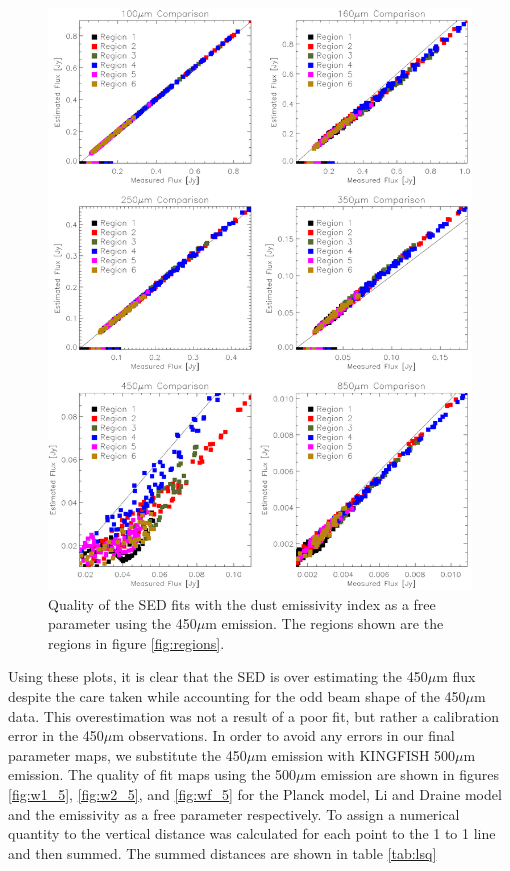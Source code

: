 \begin{figure}
  \centering
  \includegraphics[width=1.\textwidth]{sed_imgs/flux_compare_free_4.eps}
  \caption[Emissivity as a Free Parameter SED Fit Quality Using 450$\mu$m Data]{Quality of the SED fits with the dust emissivity index as a free parameter using the 450$\mu$m emission.  The regions shown are the regions in figure \ref{fig:regions}.}
  \label{fig:wf_4}
\end{figure}

Using these plots, it is clear that the SED is over estimating the 450$\mu$m flux despite the care taken while accounting for the odd beam shape of the 450$\mu$m data.  This overestimation was not a result of a poor fit, but rather a calibration error in the 450$\mu$m observations.  In order to avoid any errors in our final parameter maps, we substitute the 450$\mu$m emission with KINGFISH 500$\mu$m emission.  The quality of fit maps using the 500$\mu$m emission are shown in figures \ref{fig:w1_5}, \ref{fig:w2_5}, and \ref{fig:wf_5} for the Planck model, Li and Draine model and the emissivity as a free parameter respectively.  To assign a numerical quantity to the vertical distance was calculated for each point to the 1 to 1 line and then summed.  The summed distances are shown in table \ref{tab:lsq}

